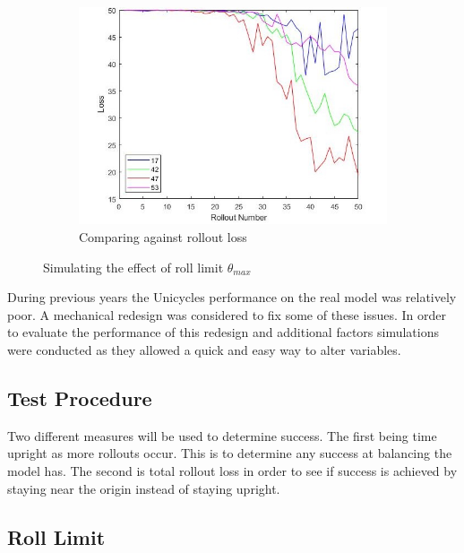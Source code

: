 \documentclass[twoside,twocolumn,12pt]{article}
\begin{document}
\begin{figure}[ht!]
\begin{subfigure}[t]{0.325\textwidth}
    \includegraphics[width=\linewidth]{average_angle_loss}
    \caption{Comparing against rollout loss}
  \label{fig:rl}
  \end{subfigure}
  \caption{Simulating the effect of roll limit $\theta_{max}$ }
  \label{fig:rolllimit}
\end{figure}

During previous years the Unicycles performance on the real model was relatively poor. A mechanical redesign was considered to fix some of these issues. In order to evaluate the performance of this redesign and additional factors simulations were conducted as they allowed a quick and easy way to alter variables.

\subsection{Test Procedure}

Two different measures will be used to determine success. The first being time upright as more rollouts occur. This is to determine any success at balancing the model has. The second is total rollout loss in order to see if success is achieved by staying near the origin instead of staying upright.
\subsection{Roll Limit}
\end{document}
